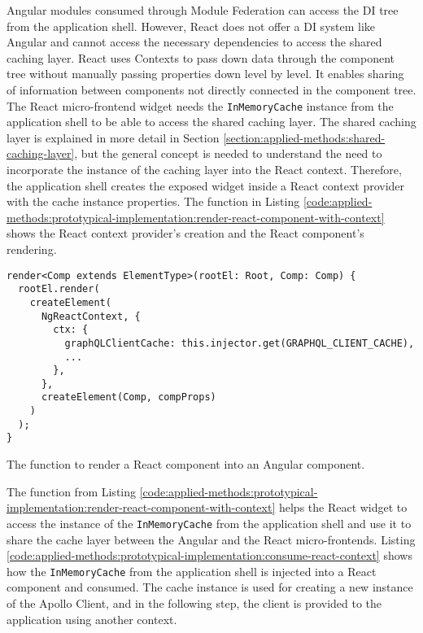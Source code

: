 \noindent Angular modules consumed through Module Federation can access the \ac{DI} tree from the application shell. However, React does not offer a \ac{DI} system like Angular and cannot access the necessary dependencies to access the shared caching layer. React uses Contexts to pass down data through the component tree without manually passing properties down level by level. It enables sharing of information between components not directly connected in the component tree. \cite{misc:-:applied-methods:react-context} The React micro-frontend widget needs the \texttt{InMemoryCache} instance from the application shell to be able to access the shared caching layer. The shared caching layer is explained in more detail in Section \ref{section:applied-methods:shared-caching-layer}, but the general concept is needed to understand the need to incorporate the instance of the caching layer into the React context. Therefore, the application shell creates the exposed widget inside a React context provider with the cache instance properties. The function in Listing \ref{code:applied-methods:prototypical-implementation:render-react-component-with-context} shows the React context provider's creation and the React component's rendering. 

\ifshowListings
\begin{listing}[H]
  \begin{verbatim}
render<Comp extends ElementType>(rootEl: Root, Comp: Comp) {
  rootEl.render(
    createElement(
      NgReactContext, {
        ctx: {
          graphQLClientCache: this.injector.get(GRAPHQL_CLIENT_CACHE),
          ...
        },
      },
      createElement(Comp, compProps)
    )
  );
}
  \end{verbatim}
  \caption{The function to render a React component into an Angular component.}\label{code:applied-methods:prototypical-implementation:render-react-component-with-context}
\end{listing}
\fi

\noindent The function from Listing \ref{code:applied-methods:prototypical-implementation:render-react-component-with-context} helps the React widget to access the instance of the \texttt{InMemoryCache} from the application shell and use it to share the cache layer between the Angular and the React micro-frontends. Listing \ref{code:applied-methods:prototypical-implementation:consume-react-context} shows how the \texttt{InMemoryCache} from the application shell is injected into a React component and consumed. The cache instance is used for creating a new instance of the Apollo Client, and in the following step, the client is provided to the application using another context.

